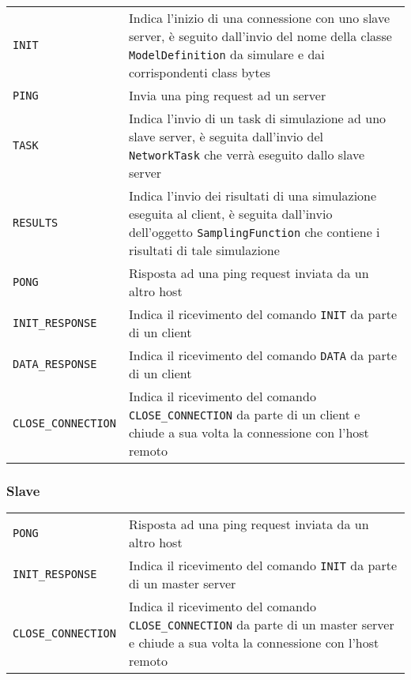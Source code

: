 \begin{table}[H]
    \begin{tabularx}{\linewidth}{ l X }
        \texttt{INIT} & Indica l'inizio di una connessione con uno slave server, è seguito dall'invio del nome della classe \texttt{ModelDefinition} da simulare e dai corrispondenti class bytes \\
        \texttt{PING} & Invia una ping request ad un server \\
        \texttt{TASK} & Indica l'invio di un task di simulazione ad uno slave server, è seguita dall'invio del \texttt{NetworkTask} che verrà eseguito dallo slave server \\
        \texttt{RESULTS} & Indica l'invio dei risultati di una simulazione eseguita al client, è seguita dall'invio dell'oggetto \texttt{SamplingFunction} che contiene i risultati di tale simulazione \\
        \texttt{PONG} & Risposta ad una ping request inviata da un altro host \\
        \texttt{INIT\_RESPONSE} & Indica il ricevimento del comando \texttt{INIT} da parte di un client \\
        \texttt{DATA\_RESPONSE} & Indica il ricevimento del comando \texttt{DATA} da parte di un client\\
        \texttt{CLOSE\_CONNECTION} & Indica il ricevimento del comando \texttt{CLOSE\_CONNECTION} da parte di un client e chiude a sua volta la connessione con l'host remoto \\
    \end{tabularx}
\end{table}

\subsubsection{Slave}

\begin{table}[H]
    \begin{tabularx}{\linewidth}{ l X }
        \texttt{PONG} & Risposta ad una ping request inviata da un altro host \\
        \texttt{INIT\_RESPONSE} & Indica il ricevimento del comando \texttt{INIT} da parte di un master server \\
        \texttt{CLOSE\_CONNECTION} & Indica il ricevimento del comando \texttt{CLOSE\_CONNECTION} da parte di un master server e chiude a sua volta la connessione con l'host remoto \\
    \end{tabularx}
\end{table}

